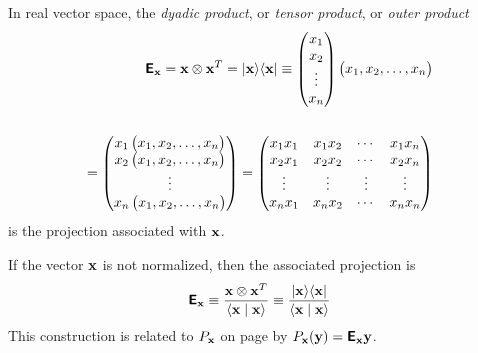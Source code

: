 In real vector space, the {\em dyadic product}, or {\em tensor product}, or {\em outer product}
\begin{equation}
\begin{split}
\textsf{\textbf{E}}_{\bf x} = {\bf x} \otimes {\bf x}^T = \vert{\bf x}\rangle \langle {\bf x}\vert
\equiv
\begin{pmatrix}
x_1\\
x_2\\
\vdots \\
x_n
\end{pmatrix}
\begin{pmatrix}x_1,x_2,\ldots ,x_n\end{pmatrix}\\
\\
=
\begin{pmatrix}
x_1\begin{pmatrix}x_1,x_2,\ldots ,x_n\end{pmatrix}\\
x_2\begin{pmatrix}x_1,x_2,\ldots ,x_n\end{pmatrix}\\
\vdots  \\
x_n\begin{pmatrix}x_1,x_2,\ldots ,x_n \end{pmatrix}
\end{pmatrix}
=
\begin{pmatrix}
x_1x_1&x_1x_2& \cdots&x_1x_n\\
x_2x_1&x_2x_2& \cdots&x_2x_n\\
\vdots & \vdots & \vdots &\vdots \\
x_nx_1&x_nx_2& \cdots&x_nx_n
\end{pmatrix}
\end{split}
\end{equation}
is the projection
associated with ${\bf x}$.

If the vector ${\bf x}$ is not normalized,
then the associated projection is
\begin{equation}
\textsf{\textbf{E}}_{\bf x} \equiv \frac{{\bf x} \otimes {\bf x}^T}{\langle {\bf x}\mid {\bf x}\rangle}
\equiv \frac{\vert{\bf x}\rangle \langle {\bf x}\vert}{\langle {\bf x}\mid {\bf x}\rangle}
\end{equation}
This construction is related to
$P_{\bf x}$ on page \pageref{2011-m-gsp}
by $P_{\bf x}({\bf y})=\textsf{\textbf{E}}_{\bf x}{\bf y}$.

